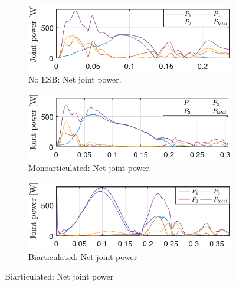 \documentclass[letterpaper, 10 pt, conference]{ieeeconf}  %
\begin{document}
\begin{figure}[ht]
	\begin{subfigure}[t]{0.32\linewidth}
		\includegraphics[width=\linewidth]{noESB/P_q}
		\caption{No ESB: Net joint power.}
		\label{fig:noESB_P_q}
	\end{subfigure}
	\begin{subfigure}[t]{0.32\linewidth}
		\includegraphics[width=\linewidth]{mono/P_q}
		\caption{Monoarticulated: Net joint power}
		\label{fig:mono_P_q}
	\end{subfigure}
	\begin{subfigure}[t]{0.32\linewidth}
		\includegraphics[width=\linewidth]{bi/P_q}
		\caption{Biarticulated: Net joint power}
		\label{fig:bi_P_q}
	\end{subfigure}
	
	\vspace{1mm}
	

\end{figure}
\end{document}
